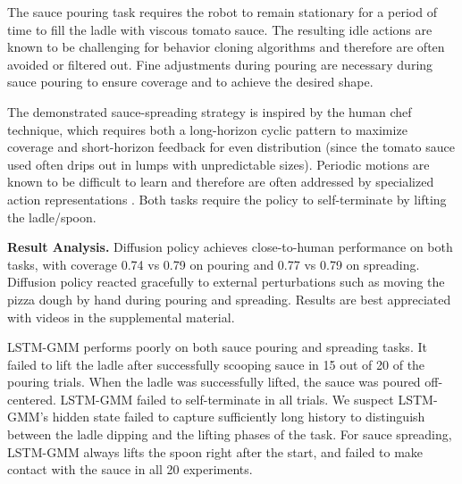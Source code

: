 The sauce pouring task requires the robot to remain stationary for a period of time to fill the ladle with viscous tomato sauce. The resulting idle actions are known to be challenging for behavior cloning algorithms and therefore are often avoided or filtered out. Fine adjustments during pouring are necessary during sauce pouring to ensure coverage and to achieve the desired shape.

The demonstrated sauce-spreading strategy is inspired by the human chef technique, which requires both a long-horizon cyclic pattern to maximize coverage and short-horizon feedback for even distribution (since the tomato sauce used often drips out in lumps with unpredictable sizes). Periodic motions are known to be difficult to learn and therefore are often addressed by specialized action representations \cite{yang2022periodic}.
Both tasks require the policy to self-terminate by lifting the ladle/spoon.




\textbf{Result Analysis.}
Diffusion policy achieves close-to-human performance on both tasks, with coverage 0.74 vs 0.79 on pouring and 0.77 vs 0.79 on spreading.
Diffusion policy reacted gracefully to external perturbations such as moving the pizza dough by hand during pouring and spreading.
Results are best appreciated with videos in the supplemental material.

LSTM-GMM performs poorly on both sauce pouring and spreading tasks. It failed to lift the ladle after successfully scooping sauce in 15 out of 20 of the pouring trials. When the ladle was successfully lifted, the sauce was poured off-centered. LSTM-GMM failed to self-terminate in all trials. We suspect LSTM-GMM's hidden state failed to capture sufficiently long history to distinguish between the ladle dipping and the lifting phases of the task. For sauce spreading, LSTM-GMM always lifts the spoon right after the start, and failed to make contact with the sauce in all 20 experiments.
